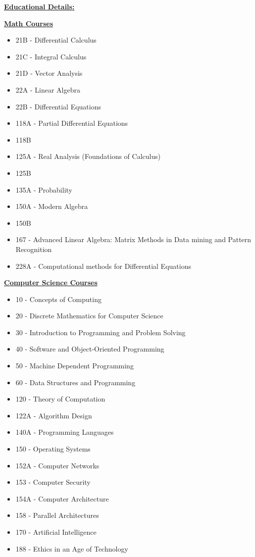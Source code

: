 \documentclass[11pt]{ltxdoc}
\begin{document}
\clearpage


\newpage

\begin{center}
  \textbf{\underline{Educational Details:}}
\end{center}

\noindent
\textbf{\underline{Math Courses}}
\begin{itemize} 
  \item 21B - Differential Calculus
  \item 21C - Integral Calculus
  \item 21D - Vector Analysis
  \item 22A - Linear Algebra
  \item 22B - Differential Equations
  \item 118A - Partial Differential Equations
  \item 118B
  \item 125A - Real Analysis (Foundations of Calculus)
  \item 125B
  \item 135A - Probability
  \item 150A - Modern Algebra
  \item 150B
  \item 167 - Advanced Linear Algebra: Matrix Methods in Data mining and Pattern Recognition
  \item 228A - Computational methods for Differential Equations
\end{itemize}

\noindent
\textbf{\underline{Computer Science Courses}}
\begin{itemize}
  \item 10 - Concepts of Computing
  \item 20 - Discrete Mathematics for Computer Science
  \item 30 - Introduction to Programming and Problem Solving
  \item 40 - Software and Object-Oriented Programming
  \item 50 - Machine Dependent Programming
  \item 60 - Data Structures and Programming
  \item 120 - Theory of Computation
  \item 122A - Algorithm Design
  \item 140A - Programming Languages
  \item 150 - Operating Systems
  \item 152A - Computer Networks
  \item 153 - Computer Security
  \item 154A - Computer Architecture
  \item 158 - Parallel Architectures
  \item 170 - Artificial Intelligence
  \item 188 - Ethics in an Age of Technology
\end{itemize}
\end{document}
